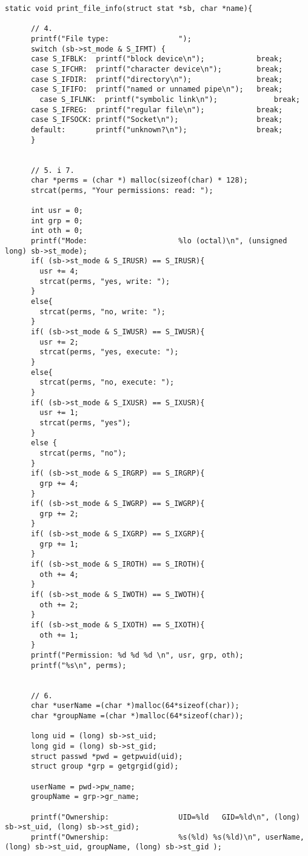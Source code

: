 \documentclass[a4paper,15pt]{article}
\begin{document}
\begin{lstlisting}[style=CStyle, label=some-code,caption=Zadania 4-10]
static void print_file_info(struct stat *sb, char *name){

	  // 4.
      printf("File type:                ");
      switch (sb->st_mode & S_IFMT) {
      case S_IFBLK:  printf("block device\n");            break;
      case S_IFCHR:  printf("character device\n");        break;
  	  case S_IFDIR:	 printf("directory\n");				  break;
  	  case S_IFIFO:	 printf("named or unnamed pipe\n");   break;
	  	case S_IFLNK:  printf("symbolic link\n");			  break;
  	  case S_IFREG:  printf("regular file\n");		      break;
      case S_IFSOCK: printf("Socket\n");			      break;
      default:       printf("unknown?\n");                break;
      }
      
      
      // 5. i 7.
      char *perms = (char *) malloc(sizeof(char) * 128);
	  strcat(perms, "Your permissions: read: ");	
	  
	  int usr = 0;
	  int grp = 0;
	  int oth = 0; 
      printf("Mode:                     %lo (octal)\n", (unsigned long) sb->st_mode);
	  if( (sb->st_mode & S_IRUSR) == S_IRUSR){
	  	usr += 4;
		strcat(perms, "yes, write: ");
	  }
	  else{
	  	strcat(perms, "no, write: ");
	  }
	  if( (sb->st_mode & S_IWUSR) == S_IWUSR){
	  	usr += 2;
		strcat(perms, "yes, execute: ");
	  }
	  else{
	  	strcat(perms, "no, execute: ");
	  }
	  if( (sb->st_mode & S_IXUSR) == S_IXUSR){
	  	usr += 1;
		strcat(perms, "yes");
	  }
	  else {
	  	strcat(perms, "no");
	  }
	  if( (sb->st_mode & S_IRGRP) == S_IRGRP){
	  	grp += 4;
	  }
	  if( (sb->st_mode & S_IWGRP) == S_IWGRP){
	  	grp += 2;
	  }
	  if( (sb->st_mode & S_IXGRP) == S_IXGRP){
	  	grp += 1;
	  }	
	  if( (sb->st_mode & S_IROTH) == S_IROTH){
	  	oth += 4;
	  }
	  if( (sb->st_mode & S_IWOTH) == S_IWOTH){
	  	oth += 2;
	  }
	  if( (sb->st_mode & S_IXOTH) == S_IXOTH){
	  	oth += 1;
	  }		
	  printf("Permission: %d %d %d \n", usr, grp, oth);
	  printf("%s\n", perms);
	  
	  
	  // 6.	  
	  char *userName =(char *)malloc(64*sizeof(char));
	  char *groupName =(char *)malloc(64*sizeof(char));  
		
	  long uid = (long) sb->st_uid;
	  long gid = (long) sb->st_gid;
	  struct passwd *pwd = getpwuid(uid);
	  struct group *grp = getgrgid(gid);
	 
	  userName = pwd->pw_name;
	  groupName = grp->gr_name;

	  printf("Ownership:                UID=%ld   GID=%ld\n", (long) sb->st_uid, (long) sb->st_gid);
	  printf("Ownership:                %s(%ld) %s(%ld)\n", userName, (long) sb->st_uid, groupName, (long) sb->st_gid );
	  

\end{lstlisting}
\end{document}
